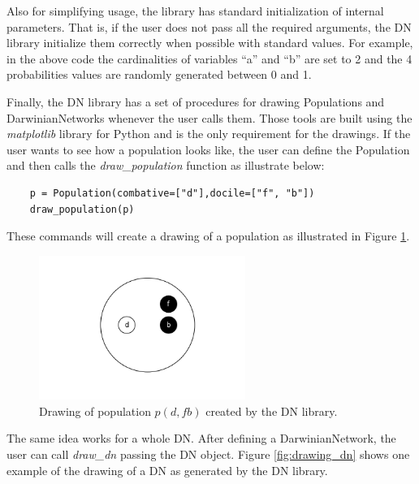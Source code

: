 Also for simplifying usage, the library has standard initialization of internal parameters.
That is, if the user does not pass all the required arguments, the DN library initialize them correctly when possible with standard values.
For example, in the above code the cardinalities of variables ``a'' and ``b'' are set to 2 and the 4 probabilities values are randomly generated between 0 and 1.

Finally, the DN library has a set of procedures for drawing Populations and DarwinianNetworks whenever the user calls them.
Those tools are built using the \emph{matplotlib} library for Python and is the only requirement for the drawings.
If the user wants to see how a population looks like, the user can define the Population and then calls the \emph{draw\_population} function as illustrate below:
\begin{verbatim}
    p = Population(combative=["d"],docile=["f", "b"])
    draw_population(p)
\end{verbatim}
These commands will create a drawing of a population as illustrated in Figure \ref{fig:drawing_pop}.

\begin{figure}[hbt]
    \begin{center}
        \includegraphics[width=0.6\textwidth]{img/drawing_population.png}
    \end{center}
    \caption{Drawing of population $p(d,fb)$ created by the DN library.}
    \label{fig:drawing_pop}
\end{figure}

The same idea works for a whole DN.
After defining a DarwinianNetwork, the user can call \emph{draw\_dn} passing the DN object.
Figure \ref{fig:drawing_dn} shows one example of the drawing of a DN as generated by the DN library.

